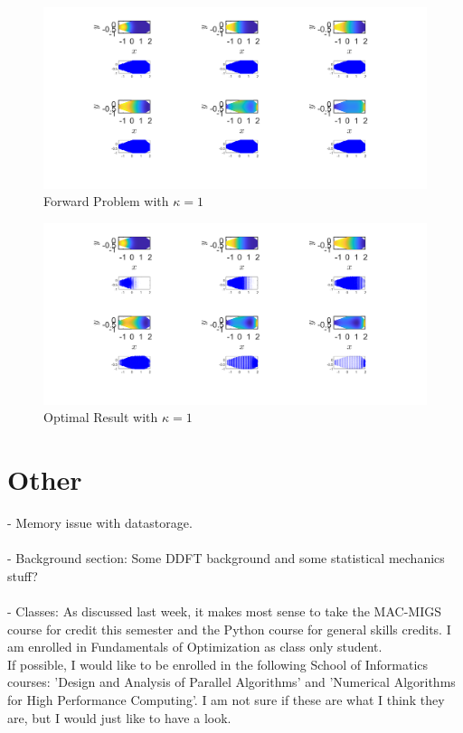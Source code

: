 \documentclass[11pt, a4paper]{article}
\theoremstyle{definition}
\begin{document}
	
	\begin{figure}[h]
		\centering
		\includegraphics[scale=0.35]{FWChannelk1.png}
		\caption{Forward Problem with $\kappa = 1$} 
		\label{F7}
	\end{figure}
	
	\begin{figure}[h]
		\centering
		\includegraphics[scale=0.35]{OptChannelk1.png}
		\caption{Optimal Result with $\kappa = 1$} 
		\label{F8}
	\end{figure}

\section{Other}
- Memory issue with datastorage.
\\
\\
- Background section: Some DDFT background and some statistical mechanics stuff?\\
\\
- Classes: As discussed last week, it makes most sense to take the MAC-MIGS course for credit this semester and the Python course for general skills credits. I am enrolled in Fundamentals of Optimization as class only student.\\
If possible, I would like to be enrolled in the following School of Informatics courses:
'Design and Analysis of Parallel Algorithms' and 'Numerical Algorithms for High Performance Computing'. 
I am not sure if these are what I think they are, but I would just like to have a look.
	
\end{document}
